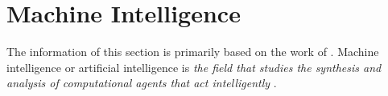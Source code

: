 \section{Machine Intelligence}\label{section:machine-intelligence}
The information of this section is primarily based on the work of \citet{misc:artificial-intelligence}.
Machine intelligence or artificial intelligence is \textit{the field that studies the synthesis and analysis of computational agents that act intelligently} \citep{misc:artificial-intelligence}.

